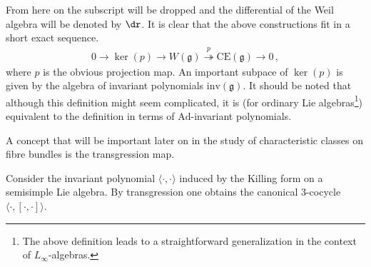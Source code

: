     From here on the subscript will be dropped and the differential of the Weil algebra will be denoted by $\dr$. It is clear that the above constructions fit in a short exact sequence.
    \begin{gather}
        \label{lie:weil_algebra_sequence}
        0\rightarrow\ker(p)\rightarrow W(\mathfrak{g})\overset{p}{\twoheadrightarrow}\mathrm{CE}(\mathfrak{g})\rightarrow0\,,
    \end{gather}
    where $p$ is the obvious projection map. An important subpace of $\ker(p)$ is given by the algebra of invariant polynomials $\mathrm{inv}(\mathfrak{g})$.
    It should be noted that although this definition might seem complicated, it is (for ordinary Lie algebras\footnote{The above definition leads to a straightforward generalization in the context of $L_\infty$-algebras.}) equivalent to the definition in terms of $\mathrm{Ad}$-invariant polynomials.

    A concept that will be important later on in the study of characteristic classes on fibre bundles is the transgression map.
    \begin{example}\label{lie:killing_transgression}
        Consider the invariant polynomial $\langle\cdot,\cdot\rangle$ induced by the Killing form on a semisimple Lie algebra. By transgression one obtains the canonical 3-cocycle $\langle\cdot,[\cdot,\cdot]\rangle$.
    \end{example}